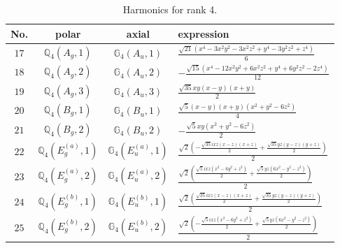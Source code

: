 \documentclass[fleqn,8pt,landscape]{jsarticle}
\begin{document}
\begin{table}[ht!]
\begin{center}
\caption{Harmonics for rank 4.}
\renewcommand{\arraystretch}{1.3}
\begin{tabular}{cccl} \hline \hline
No. & polar & axial & expression \\ \hline
$ 17 $ & $ \mathbb{Q}_{4}(A_{g},1) $ & $ \mathbb{G}_{4}(A_{u},1) $ & $ \frac{\sqrt{21} \left(x^{4} - 3 x^{2} y^{2} - 3 x^{2} z^{2} + y^{4} - 3 y^{2} z^{2} + z^{4}\right)}{6} $ \\
$ 18 $ & $ \mathbb{Q}_{4}(A_{g},2) $ & $ \mathbb{G}_{4}(A_{u},2) $ & $ - \frac{\sqrt{15} \left(x^{4} - 12 x^{2} y^{2} + 6 x^{2} z^{2} + y^{4} + 6 y^{2} z^{2} - 2 z^{4}\right)}{12} $ \\
$ 19 $ & $ \mathbb{Q}_{4}(A_{g},3) $ & $ \mathbb{G}_{4}(A_{u},3) $ & $ \frac{\sqrt{35} x y \left(x - y\right) \left(x + y\right)}{2} $ \\
$ 20 $ & $ \mathbb{Q}_{4}(B_{g},1) $ & $ \mathbb{G}_{4}(B_{u},1) $ & $ \frac{\sqrt{5} \left(x - y\right) \left(x + y\right) \left(x^{2} + y^{2} - 6 z^{2}\right)}{4} $ \\
$ 21 $ & $ \mathbb{Q}_{4}(B_{g},2) $ & $ \mathbb{G}_{4}(B_{u},2) $ & $ - \frac{\sqrt{5} x y \left(x^{2} + y^{2} - 6 z^{2}\right)}{2} $ \\
$ 22 $ & $ \mathbb{Q}_{4}(E_{g}^{(a)},1) $ & $ \mathbb{G}_{4}(E_{u}^{(a)},1) $ & $ \frac{\sqrt{2} \left(- \frac{\sqrt{35} i x z \left(x - z\right) \left(x + z\right)}{2} + \frac{\sqrt{35} y z \left(y - z\right) \left(y + z\right)}{2}\right)}{2} $ \\
$ 23 $ & $ \mathbb{Q}_{4}(E_{g}^{(a)},2) $ & $ \mathbb{G}_{4}(E_{u}^{(a)},2) $ & $ \frac{\sqrt{2} \left(\frac{\sqrt{5} i x z \left(x^{2} - 6 y^{2} + z^{2}\right)}{2} + \frac{\sqrt{5} y z \left(6 x^{2} - y^{2} - z^{2}\right)}{2}\right)}{2} $ \\
$ 24 $ & $ \mathbb{Q}_{4}(E_{g}^{(b)},1) $ & $ \mathbb{G}_{4}(E_{u}^{(b)},1) $ & $ \frac{\sqrt{2} \left(\frac{\sqrt{35} i x z \left(x - z\right) \left(x + z\right)}{2} + \frac{\sqrt{35} y z \left(y - z\right) \left(y + z\right)}{2}\right)}{2} $ \\
$ 25 $ & $ \mathbb{Q}_{4}(E_{g}^{(b)},2) $ & $ \mathbb{G}_{4}(E_{u}^{(b)},2) $ & $ \frac{\sqrt{2} \left(- \frac{\sqrt{5} i x z \left(x^{2} - 6 y^{2} + z^{2}\right)}{2} + \frac{\sqrt{5} y z \left(6 x^{2} - y^{2} - z^{2}\right)}{2}\right)}{2} $ \\
 \hline \hline
\end{tabular}
\end{center}
\end{table}
\end{document}
